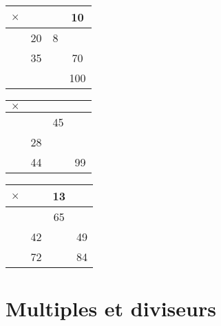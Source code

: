 \begin{activite}
\begin{QCM}
{    \medskip
      \hfill
      \begin{tabular}{|C{0.5}||C{0.5}|C{0.5}|C{0.5}|}
         \hline
         {\Large $\times$} & & & 10 \\
         \hline\hline
         & 20 & 8 & \\
         \hline
         & 35 & & 70 \\
         \hline
         & & & 100 \\
         \hline
      \end{tabular}
      \hfill
      \begin{tabular}{|C{0.5}||C{0.5}|C{0.5}|C{0.5}|}
         \hline
         {\Large $\times$} & & & \\
         \hline\hline
         & & 45 & \\
         \hline
         & 28 & & \\
         \hline
         & 44 & & 99 \\
         \hline
      \end{tabular}
      \hfill
      \begin{tabular}{|C{0.5}||C{0.5}|C{0.5}|C{0.5}|}
         \hline
         {\Large $\times$} & & 13 & \\
         \hline\hline
         & & 65 & \\
         \hline
         & 42 & & 49 \\
         \hline
         & 72 & & 84 \\
         \hline
      \end{tabular}}
      \hspace*{1cm}
      \vspace*{1cm}
   \end{QCM}
\end{activite}


\cours 

\section{Multiples et diviseurs}

